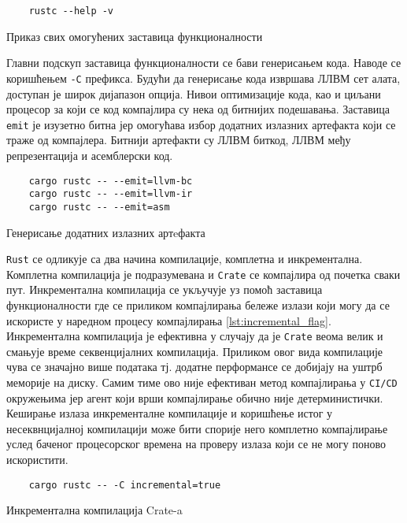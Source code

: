 \begin{listing}[H]
\begin{verbatim}
    rustc --help -v 
\end{verbatim}
\caption{Приказ свих омогућених заставица функционалности}
\label{lst:rustc_flags}
\end{listing}

Главни подскуп заставица функционалности се бави генерисањем кода. Наводе се коришћењем \verb|-C| префикса. 
Будући да генерисање кода извршава 
ЛЛВМ сет алата, доступан је широк дијапазон опција. Нивои оптимизације кода, као и циљани процесор за који 
се код компајлира су нека од битнијих подешавања. Заставица \verb|emit| је изузетно битна јер омогућава избор 
додатних излазних артефакта који се траже од компајлера. Битнији артефакти су ЛЛВМ биткод, ЛЛВМ међу 
репрезентација и асемблерски код.

\begin{listing}[H]
\begin{verbatim}
    cargo rustc -- --emit=llvm-bc
    cargo rustc -- --emit=llvm-ir
    cargo rustc -- --emit=asm
\end{verbatim}
\caption{Генерисање додатних излазних артeфакта}
\label{lst:emit_flag}
\end{listing}


\verb|Rust| се одликује са два начина компилације, комплетна 
и инкрементална. Комплетна компилација је подразумевана и \verb|Crate| се компајлира од почетка сваки пут.
Инкрементална компилација се укључује уз помоћ заставица функционалности где се приликом компајлирања 
бележе излази који могу да се искористе у наредном процесу компајлирања \ref{lst:incremental_flag}. Инкрементална компилација је 
ефективна у случају да је \verb|Crate| веома велик и смањује време секвенцијалних компилација. Приликом овог 
вида компилације чува се значајно више података тј. додатне перформансе се добијају на уштрб меморије на диску.
Самим тиме ово није ефективан метод компајлирања у \verb|CI/CD| окружењима јер агент који врши компајлирање
обично није детерминистички. Кеширање излаза инкременталне компилације и коришћење истог у несеквнцијалној 
компилацији може бити спорије него комплетно компајлирање услед баченог процесорског времена на проверу 
излаза који се не могу поново искористити.

\begin{listing}[H]
\begin{verbatim}
    cargo rustc -- -C incremental=true 
\end{verbatim}
\caption{Инкрементална компилација Crate-a}
\label{lst:incremental_flag}
\end{listing}


